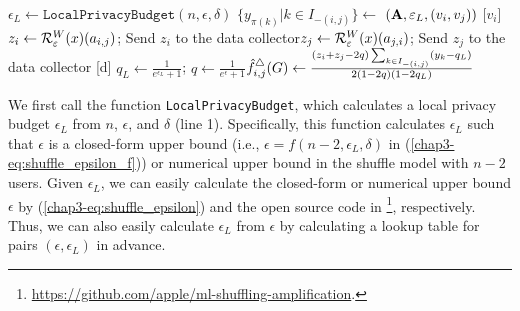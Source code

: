 \setlength{\algomargin}{5mm}
\begin{algorithm}[t]
  \SetAlgoLined
  $\epsilon_L \leftarrow \texttt{LocalPrivacyBudget}(n,\epsilon,\delta)$\;
  $\{y_{\pi(k)} | k \in I_{-(i,j)}\} \leftarrow$ \AlgWS{}$(\mathbf{A}, \varepsilon_L, (v_i, v_j))$\;
  [$v_i$] $z_i \leftarrow \mathcal{R}_{\varepsilon}^W(x)(a_{i,j})$; Send $z_i$ to the data collector\;
  [$v_j$] $z_j \leftarrow \mathcal{R}_{\varepsilon}^W(x)(a_{j,i})$; Send $z_j$ to the data collector\;
  [d] $q_L \leftarrow \frac{1}{e^{\epsilon_L}+1}$; $q \leftarrow
  \frac{1}{e^\epsilon+1}$\;
  [d] $\hat{f}_{i,j}^\triangle(G) \leftarrow \frac{(z_i+z_j-2q)\sum_{k \in
  I_{-(i,j)}} (y_{k} - q_L)}{2(1-2q)(1-2q_L)}$\;
  [d] 
  \caption{\AlgWSLE{}
  (Wedge Shuffling with Local Edges).
  \AlgWS{} is shown in Algorithm~\ref{chap3-alg:WShuffle}.
  }\label{chap3-alg:WSLE}
\end{algorithm}

We first call the function \texttt{LocalPrivacyBudget}, which calculates a local privacy budget $\epsilon_L$ from $n$, $\epsilon$, and $\delta$ (line 1).
Specifically, this function calculates $\epsilon_L$
such that $\epsilon$ is a closed-form upper bound (i.e., $\epsilon = f(n-2, \epsilon_L, \delta)$ in (\ref{chap3-eq:shuffle_epsilon_f})) or numerical upper bound in the shuffle model with $n-2$ users.
Given $\epsilon_L$, we can easily calculate the closed-form or numerical upper bound $\epsilon$ by (\ref{chap3-eq:shuffle_epsilon}) and the open source code in \cite{Feldman_FOCS21}\footnote{\url{https://github.com/apple/ml-shuffling-amplification}.}, respectively.
Thus, we can also easily calculate $\epsilon_L$ from $\epsilon$ by calculating a lookup table for pairs $(\epsilon, \epsilon_L)$ in advance.

